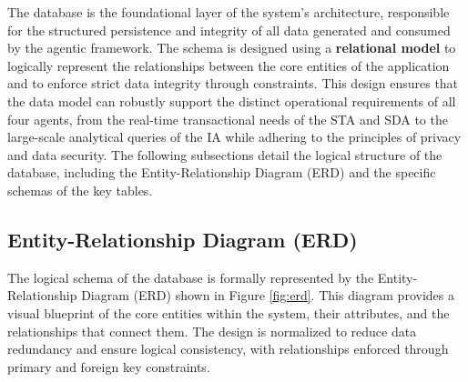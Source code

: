 The database is the foundational layer of the system's architecture, responsible for the structured persistence and integrity of all data generated and consumed by the agentic framework. The schema is designed using a \textbf{relational model} to logically represent the relationships between the core entities of the application and to enforce strict data integrity through constraints. This design ensures that the data model can robustly support the distinct operational requirements of all four agents, from the real-time transactional needs of the STA and SDA to the large-scale analytical queries of the IA while adhering to the principles of privacy and data security. The following subsections detail the logical structure of the database, including the Entity-Relationship Diagram (ERD) and the specific schemas of the key tables.

\subsection{Entity-Relationship Diagram (ERD)}
\label{subsec:erd}

The logical schema of the database is formally represented by the Entity-Relationship Diagram (ERD) shown in Figure \ref{fig:erd}. This diagram provides a visual blueprint of the core entities within the system, their attributes, and the relationships that connect them. The design is normalized to reduce data redundancy and ensure logical consistency, with relationships enforced through primary and foreign key constraints.

